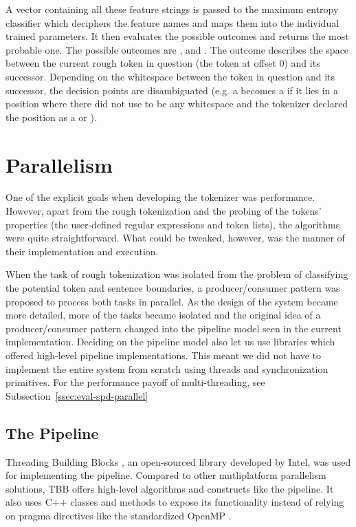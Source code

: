 A vector containing all these feature strings is passed to the maximum entropy
classifier which deciphers the feature names and maps them into the individual
trained parameters. It then evaluates the possible outcomes and returns the
most probable one. The possible outcomes are \mynoboundary{},
\mytokenboundary{} and \mysentenceboundary{}. The outcome describes the space
between the current rough token in question (the token at offset 0) and its
successor. Depending on the whitespace between the token in question and its
successor, the decision points are disambiguated (e.g. a \maysplit{} becomes a
\dosplit{} if it lies in a position where there did not use to be any
whitespace and the tokenizer declared the position as a \mytokenboundary{} or
\mysentenceboundary{}).


\section{Parallelism}
\label{sec:impl-parallel}

One of the explicit goals when developing the tokenizer was performance.
However, apart from the rough tokenization and the probing of the tokens'
properties (the user-defined regular expressions and token lists), the
algorithms were quite straightforward. What could be tweaked, however, was the
manner of their implementation and execution. 

When the task of rough tokenization was isolated from the problem of
classifying the potential token and sentence boundaries, a producer/consumer
pattern was proposed to process both tasks in parallel. As the design of the
system became more detailed, more of the tasks became isolated and the original
idea of a producer/consumer pattern changed into the pipeline model seen in the
current implementation. Deciding on the pipeline model also let us use
libraries which offered high-level pipeline implementations. This meant we did
not have to implement the entire system from scratch using threads and
synchronization primitives. For the performance payoff of multi-threading, see
Subsection~\ref{ssec:eval-spd-parallel}

\subsection{The Pipeline}
\label{ssec:impl-parallel-pipeline}

Threading Building Blocks \cite{web-tbb}, an open-sourced library developed by
Intel, was used for implementing the pipeline. Compared to other mutliplatform
parallelism solutions, TBB offers high-level algorithms and constructs like the
pipeline. It also uses C++ classes and methods to expose its functionality
instead of relying on pragma directives like the standardized OpenMP
\cite{web-openmp}. 

